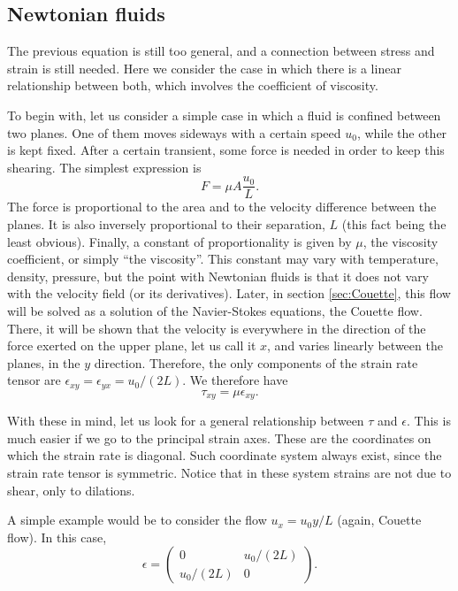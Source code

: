 \subsection{Newtonian fluids}
\label{sec:Newtonian}

The previous equation is still too general, and a connection between
stress and strain is still needed. Here we consider the case in which
there is a linear relationship between both, which involves the
coefficient of viscosity.

To begin with, let us consider a simple case in which a fluid is
confined between two planes. One of them moves sideways with a certain
speed $u_0$, while the other is kept fixed. After a certain transient,
some force is needed in order to keep this shearing. The simplest
expression is
\[
F= \mu A \frac{u_0}{L} .
\]
The force is proportional to the area and to the velocity difference
between the planes. It is also inversely proportional to their
separation, $L$ (this fact being the least obvious). Finally, a
constant of proportionality is given by $\mu$, the viscosity
coefficient, or simply ``the viscosity''. This constant may vary with
temperature, density, pressure, but the point with Newtonian fluids is
that it does not vary with the velocity field (or its
derivatives). Later, in section \ref{sec:Couette}, this flow will be
solved as a solution of the Navier-Stokes equations, the Couette
flow. There, it will be shown that the velocity is everywhere in the
direction of the force exerted on the upper plane, let us call it $x$,
and varies linearly between the planes, in the $y$
direction. Therefore, the only components of the strain rate tensor
are $\epsilon_{xy} = \epsilon_{yx} = u_0 / ( 2 L )$. We therefore have
\[
\tau_{xy} = \mu  \epsilon_{xy} .
\]

With these in mind, let us look for a general relationship between
$\tau$ and $\epsilon$. This is much easier if we go to the principal
strain axes. These are the coordinates on which the strain rate is
diagonal. Such coordinate system always exist, since the strain rate
tensor is symmetric. Notice that in these system strains are not due to
shear, only to dilations.

A simple example would be to consider the flow $u_x = u_0 y / L$
(again, Couette flow). In this case,
\[
\epsilon=
\begin{pmatrix}
  0           &   u_0/(2L)  \\
   u_0/(2L)   &   0
\end{pmatrix} .
\]


